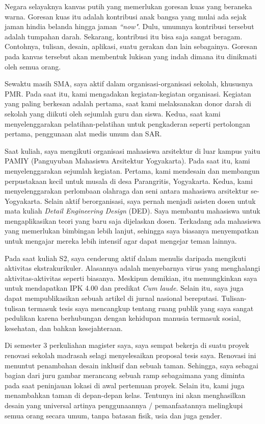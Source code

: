 \documentclass[../main.tex]{subfiles}
\begin{document}
Negara selayaknya kanvas putih yang memerlukan goresan kuas yang beraneka warna. Goresan kuas itu adalah kontribusi anak bangsa yang mulai ada sejak jaman hindia belanda hingga jaman \textit{``now"}. Dulu, umumnya kontribusi tersebut adalah tumpahan darah. Sekarang, kontribusi itu bisa saja sangat beragam. Contohnya, tulisan, desain, aplikasi, suatu gerakan dan lain sebagainya. Goresan pada kanvas tersebut akan membentuk lukisan yang indah dimana itu dinikmati oleh semua orang. %

Sewaktu masih SMA, saya aktif dalam organisasi-organisasi sekolah, khususnya PMR. Pada saat itu, kami mengadakan kegiatan-kegiatan organisasi. Kegiatan yang paling berkesan adalah pertama, saat kami melaksanakan donor darah di sekolah yang diikuti oleh sejumlah guru dan siswa. Kedua, saat kami menyelenggarakan pelatihan-pelatihan untuk pengkaderan seperti pertolongan pertama, penggunaan alat medis umum dan SAR.

Saat kuliah, saya mengikuti organisasi mahasiswa arsitektur di luar kampus yaitu PAMIY (Panguyuban Mahasiswa Arsitektur Yogyakarta). Pada saat itu, kami menyelenggarakan sejumlah kegiatan. Pertama, kami mendesain dan membangun perpustakaan kecil untuk musala di desa Parangritis, Yogyakarta. Kedua, kami menyelenggarakan perlombaan olahraga dan seni antara mahasiswa arsitektur se-Yogyakarta. Selain aktif berorganisasi, saya pernah menjadi asisten dosen untuk mata kuliah \textit{Detail Engineering Design} (DED). Saya membantu mahasiswa untuk mengaplikasikan teori yang baru saja dijelaskan dosen. Terkadang ada mahasiswa yang memerlukan bimbingan lebih lanjut, sehingga saya biasanya menyempatkan untuk mengajar mereka lebih intensif agar dapat mengejar teman lainnya.

Pada saat kuliah S2, saya cenderung aktif dalam menulis daripada mengikuti aktivitas ekstrakurikuler. Alasannya adalah menyebarnya virus yang menghalangi aktivitas-aktivitas seperti biasanya. Meskipun demikian, itu memungkinkan saya untuk mendapatkan IPK 4.00 dan predikat \textit{Cum laude}. Selain itu, saya juga dapat mempublikasikan sebuah artikel di jurnal nasional bereputasi. Tulisan-tulisan termasuk tesis saya mencangkup tentang ruang publik yang saya sangat pedulikan karena berhubungan dengan kehidupan manusia termasuk sosial, kesehatan, dan bahkan kesejahteraan.

Di semester 3 perkuliahan magister saya, saya sempat bekerja di suatu proyek renovasi sekolah madrasah selagi menyelesaikan proposal tesis saya.
Renovasi ini menuntut penambahan desain inklusif dan sebuah taman.
Sehingga, saya sebagai bagian dari juru gambar merancang sebuah ramp sebagaimana yang diminta pada saat peninjauan lokasi di awal pertemuan proyek. Selain itu, kami juga menambahkan taman di depan-depan kelas. Tentunya ini akan menghasilkan desain yang universal artinya penggunaannya / pemanfaatannya melingkupi semua orang secara umum, tanpa batasan fisik, usia dan juga gender.
\end{document}
